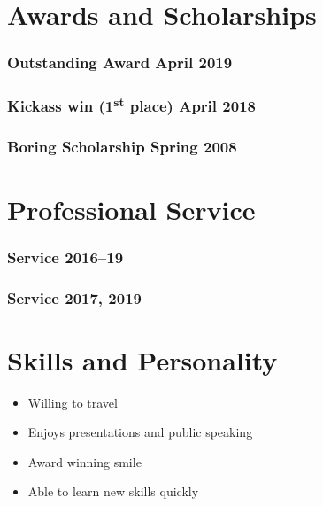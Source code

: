 \documentclass[11pt]{article}
\begin{document}

\section*{Awards and Scholarships}
\subsubsection*{Outstanding Award \hfill April 2019}
\subsubsection*{Kickass win (1\textsuperscript{st} place) \hfill April 2018}
\subsubsection*{Boring Scholarship \hfill Spring 2008}


\section*{Professional Service}
\subsubsection*{Service \hfill 2016--19}
\subsubsection*{Service \hfill 2017, 2019}



\section*{Skills and Personality}
\begin{itemize}
	\item Willing to travel
	\item Enjoys presentations and public speaking
	\item Award winning smile
	\item Able to learn new skills quickly
\end{itemize}
\end{document}
